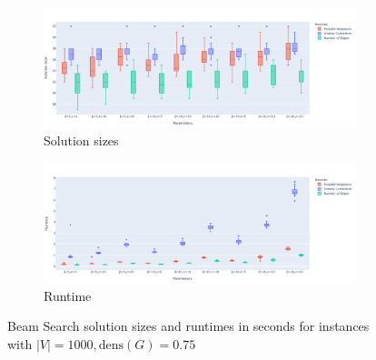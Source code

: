 \documentclass[draft,final]{vutinfth} %
\begin{document}
\begin{figure}
    \centering
    \begin{subfigure}{\textwidth}
        \centering
        \includegraphics[width=\textwidth]{graphics/lbh-075-1000-size.pdf}
        \caption{Solution sizes}
    \end{subfigure}
    \begin{subfigure}{\textwidth}
        \centering
        \includegraphics[width=\textwidth]{graphics/lbh-075-1000-runtime.pdf}
        \caption{Runtime}
    \end{subfigure}
    \caption{Beam Search solution sizes and runtimes in seconds for instances with $|V|=1000, \mathrm{dens}(G)=0.75$}
    \label{fig:bs-heuristics-random-3}
\end{figure}
\end{document}
